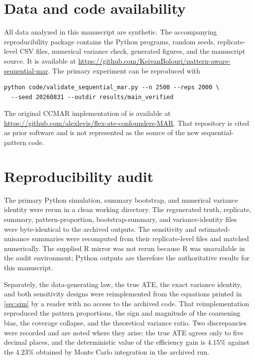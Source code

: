 \documentclass[11pt]{article}
\newif\ifinternal
\theoremstyle{definition}
\newcommand{\1}{\mathbf{1}}
\begin{document}
\ifinternal
\medskip
\noindent\textbf{Internal readiness note (not for submission).} Remaining items
before the manuscript is sent out: independent semiparametric review of
\cref{thm:eif,prop:drift,thm:gap}; a substantive data application; a learner
library and misspecification grid; weight-truncation and near-positivity
sensitivity analyses; and a public software interface with unit tests and
documented diagnostics.
\fi

\section*{Data and code availability}

All data analyzed in this manuscript are synthetic. The accompanying reproducibility package contains the Python programs, random seeds, replicate-level CSV files, numerical variance check, generated figures, and the manuscript source. It is available at
\url{https://github.com/KeivanBolouri/pattern-aware-sequential-mar}.
The primary experiment can be reproduced with
\begin{verbatim}
python code/validate_sequential_mar.py --n 2500 --reps 2000 \
  --seed 20260831 --outdir results/main_verified
\end{verbatim}
The original CCMAR implementation of \citet{levis2025} is available at
\url{https://github.com/alexlevis/flex-ate-confounders-MAR}. That repository is cited as prior software and is not represented as the source of the new sequential-pattern code.

\ifinternal
\section*{Reproducibility audit}

The primary Python simulation, summary bootstrap, and numerical variance
identity were rerun in a clean working directory. The regenerated truth,
replicate, summary, pattern-proportion, bootstrap-summary, and variance-identity
files were byte-identical to the archived outputs. The sensitivity and
estimated-nuisance summaries were recomputed from their replicate-level files
and matched numerically. The supplied R mirror was not rerun because R was
unavailable in the audit environment; Python outputs are therefore the
authoritative results for this manuscript.

Separately, the data-generating law, the true ATE, the exact variance identity,
and both sensitivity designs were reimplemented from the equations printed in
\cref{sec:sim} by a reader with no access to the archived code. That
reimplementation reproduced the pattern proportions, the sign and magnitude of
the coarsening bias, the coverage collapse, and the theoretical variance ratio.
Two discrepancies were recorded and are noted where they arise: the true ATE
agrees only to five decimal places, and the deterministic value of the
efficiency gain is $4.15\%$ against the $4.23\%$ obtained by Monte Carlo
integration in the archived run.
\else
\end{document}
